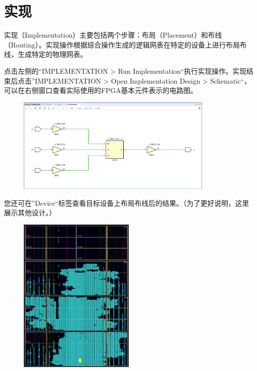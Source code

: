 \documentclass{ctexart}
\begin{document}

\section{实现}

实现（Implementation）主要包括两个步骤：布局（Placement）和布线（Routing）。实现操作根据综合操作生成的逻辑网表在特定的设备上进行布局布线，生成特定的物理网表。

点击左侧的“IMPLEMENTATION > Run Implementation“执行实现操作。实现结束后点击”IMPLEMENTATION > Open Implementation Design > Schematic“， 可以在右侧窗口查看实际使用的FPGA基本元件表示的电路图。

\begin{figure}[H]
    \centering
    \includegraphics[width=0.85\textwidth]{lab0/28.png}
\end{figure}

您还可在”Device“标签查看目标设备上布局布线后的结果。（为了更好说明，这里展示其他设计。）

\begin{figure}[H]
    \centering
    \includegraphics[width=0.5\textwidth]{lab0/29.png}
\end{figure}
\end{document}
